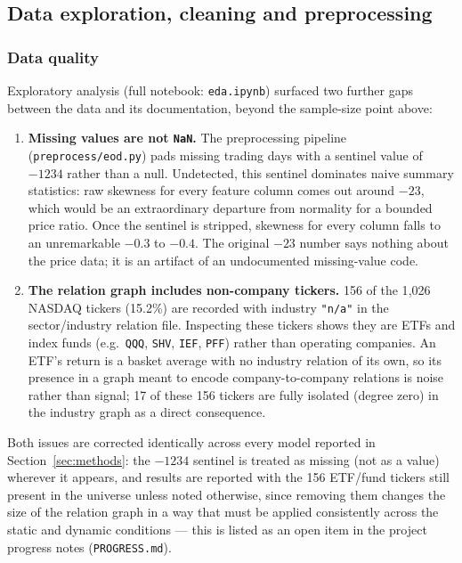 \documentclass[12pt]{article}
\begin{document}
\subsection{Data exploration, cleaning and preprocessing}

\subsubsection{Data quality}

Exploratory analysis (full notebook: \texttt{eda.ipynb}) surfaced two further
gaps between the data and its documentation, beyond the sample-size point above:

\begin{enumerate}
  \item \textbf{Missing values are not \texttt{NaN}.} The preprocessing pipeline
  (\texttt{preprocess/eod.py}) pads missing trading days with a sentinel value of $-1234$ rather
  than a null. Undetected, this sentinel dominates naive summary statistics: raw skewness for
  every feature column comes out around $-23$, which would be an extraordinary departure from
  normality for a bounded price ratio. Once the sentinel is stripped, skewness for every column
  falls to an unremarkable $-0.3$ to $-0.4$. The original $-23$ number says nothing about the
  price data; it is an artifact of an undocumented missing-value code.
  \item \textbf{The relation graph includes non-company tickers.} 156 of the 1{,}026 NASDAQ
  tickers (15.2\%) are recorded with industry \texttt{"n/a"} in the sector/industry relation file.
  Inspecting these tickers shows they are ETFs and index funds (e.g.\ \texttt{QQQ}, \texttt{SHV},
  \texttt{IEF}, \texttt{PFF}) rather than operating companies. An ETF's return is a basket average
  with no industry relation of its own, so its presence in a graph meant to encode
  company-to-company relations is noise rather than signal; 17 of these 156 tickers are fully
  isolated (degree zero) in the industry graph as a direct consequence.
\end{enumerate}

Both issues are corrected identically across every model reported in Section~\ref{sec:methods}:
the $-1234$ sentinel is treated as missing (not as a value) wherever it appears, and results are
reported with the 156 ETF/fund tickers still present in the universe unless noted otherwise, since
removing them changes the size of the relation graph in a way that must be applied consistently
across the static and dynamic conditions --- this is listed as an open item in the project
progress notes (\texttt{PROGRESS.md}).
\end{document}
